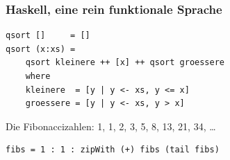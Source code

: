 \documentclass[12pt,compress,ngerman,utf8,t]{beamer}
\begin{document}
\begin{frame}[fragile]\frametitle{Haskell, eine rein funktionale Sprache}
  \large\vspace{-0.5em}
  \begin{verbatim}
qsort []     = []
qsort (x:xs) =
    qsort kleinere ++ [x] ++ qsort groessere
    where
    kleinere  = [y | y <- xs, y <= x]
    groessere = [y | y <- xs, y > x]
  \end{verbatim}
  \vfill


  \pause
  Die Fibonaccizahlen: 1, 1, 2, 3, 5, 8, 13, 21, 34, \ldots
  \begin{verbatim}
fibs = 1 : 1 : zipWith (+) fibs (tail fibs)
  \end{verbatim}


\end{frame}
\end{document}
